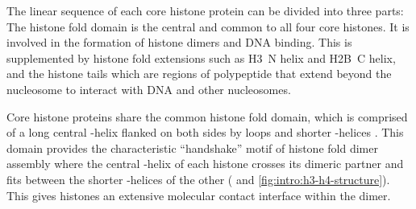       The linear sequence of each core histone protein can be divided
      into three parts: The histone fold domain is the central and
      common to all four core histones.  It is
      involved in the formation of histone dimers and DNA binding.
      This is supplemented by histone fold extensions such as
      H3~\textalpha{}N helix and H2B~\textalpha{}C helix,
      and the histone tails which are regions of polypeptide
      that extend beyond the nucleosome to interact with DNA and
      other nucleosomes.

      Core histone proteins share the common
      histone fold domain, which is comprised of a long central
      \textalpha-helix flanked on both sides by loops
      and shorter \textalpha-helices \citep{arents1991-31angstrom, arents1995histone-fold}.
      This domain provides the characteristic ``handshake'' motif
      of histone fold dimer assembly where the central \textalpha-helix of each
      histone crosses its dimeric partner and fits between the shorter
      \textalpha-helices of the other (
      and \ref{fig:intro:h3-h4-structure}).
      This gives histones an extensive molecular contact interface
      within the dimer.

